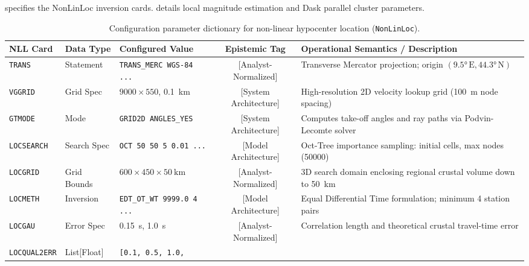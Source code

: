  specifies the \ac{NonLinLoc} inversion cards.
 details local magnitude estimation and
Dask parallel cluster parameters.
\begin{landscape}
  \begin{table}[htbp]
    \centering
    \small
    \caption{Configuration parameter dictionary for non-linear
    hypocenter location (\texttt{NonLinLoc}).}
    \label{tab:app_nll_dictionary}
    \begin{threeparttable}
      \begin{tabularx}{\linewidth}{l l l c >{\raggedright\arraybackslash}X}
        \toprule
        \textbf{NLL Card} & \textbf{Data Type} & \textbf{Configured
        Value} & \textbf{Epistemic Tag} & \textbf{Operational
        Semantics / Description} \\
        \midrule
        \texttt{TRANS} & Statement & \texttt{TRANS\_MERC WGS-84 ...} &
        [Analyst-Normalized] & Transverse Mercator projection; origin
        $(\ang{9.5}\,\mathrm{E}, \ang{44.3}\,\mathrm{N})$ \\
        \texttt{VGGRID} & Grid Spec & $\num{9000} \times \num{550}$,
        \qty{0.1}{\kilo\meter} & [System Architecture] &
        High-resolution 2D velocity lookup grid (\qty{100}{\meter}
        node spacing) \\
        \texttt{GTMODE} & Mode & \texttt{GRID2D ANGLES\_YES} & [System
        Architecture] & Computes take-off angles and ray paths via
        Podvin-Lecomte solver \\
        \texttt{LOCSEARCH} & Search Spec & \texttt{OCT 50 50 5 0.01
        ...} & [Model Architecture] & Oct-Tree importance sampling:
        initial cells, max nodes (\num{50000}) \\
        \texttt{LOCGRID} & Grid Bounds & $\num{600} \times \num{450} \times
        \qty{50}{\kilo\meter}$ & [Analyst-Normalized] & 3D search
        domain enclosing regional crustal volume down to
        \qty{50}{\kilo\meter} \\
        \texttt{LOCMETH} & Inversion & \texttt{EDT\_OT\_WT 9999.0 4
        ...} & [Model Architecture] & Equal Differential Time
        formulation; minimum 4 station pairs \\
        \texttt{LOCGAU} & Error Spec & \qty{0.15}{\second},
        \qty{1.0}{\second} & [Analyst-Normalized] & Correlation
        length and theoretical crustal travel-time error \\
        \texttt{LOCQUAL2ERR} & List[Float] & \texttt{[0.1, 0.5, 1.0,
}
\end{tabularx}
\end{threeparttable}
\end{table}
\end{landscape}
